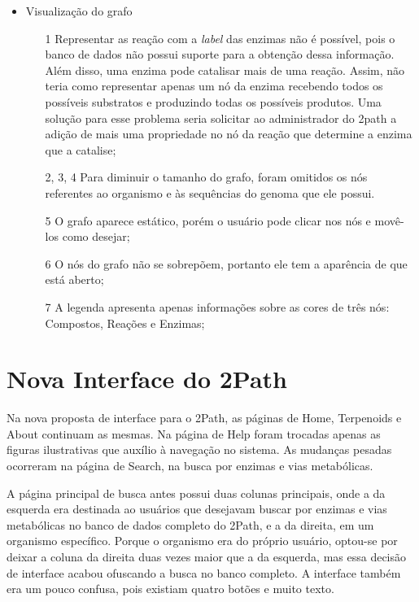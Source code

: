 \begin{itemize}
\item Visualização do grafo
  \begin{itemize} 
  \item[1] Representar as reação com a \textit{label} das enzimas não é possível, pois o banco de dados não possui suporte para a obtenção dessa informação. Além disso, uma enzima pode catalisar mais de uma reação. Assim, não teria como representar apenas um nó da enzima recebendo todos os possíveis substratos e produzindo todas os possíveis produtos. Uma solução para esse problema seria solicitar ao administrador do 2path a adição de mais uma propriedade no nó da reação que determine a enzima que a catalise;
  \item[2, 3, 4] Para diminuir o tamanho do grafo, foram omitidos os nós referentes ao organismo e às sequências do genoma que ele possui.
  \item[5] O grafo aparece estático, porém o usuário pode clicar nos nós e movê-los como desejar;
  \item[6] O nós do grafo não se sobrepõem, portanto ele tem a aparência de que está aberto;
  \item[7] A legenda apresenta apenas informações sobre as cores de três nós: Compostos, Reações e Enzimas;
  \end{itemize}
\end{itemize}
 
 
\newpage
\section{Nova Interface do 2Path} \label{novaInterface}

\indent Na nova proposta de interface para o 2Path, as páginas de Home, Terpenoids e About continuam as mesmas. Na página de Help foram trocadas apenas as figuras ilustrativas que auxílio à navegação no sistema. As mudanças pesadas ocorreram na página de Search, na busca por enzimas e vias metabólicas.

\indent A página principal de busca antes possui duas colunas principais, onde a da esquerda era destinada ao usuários que desejavam buscar por enzimas e vias metabólicas no banco de dados completo do 2Path, e a da direita, em um organismo específico. Porque o organismo era do próprio usuário, optou-se por deixar a coluna da direita duas vezes maior que a da esquerda, mas essa decisão de interface acabou ofuscando a busca no banco completo. A interface também era um pouco confusa, pois existiam quatro botões e muito texto.

